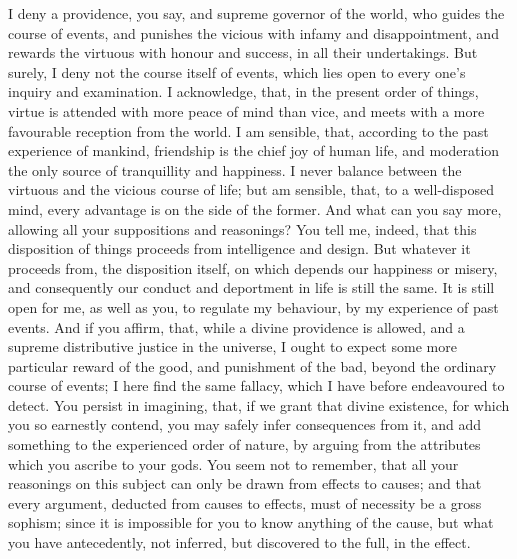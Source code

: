 \documentclass[]{article}
\begin{document}
\begin{sectionbody}
\humeparagraph  I deny a providence, you say, and supreme governor of the world, who guides the course of events, and punishes the vicious with infamy and disappointment, and rewards the virtuous with honour and success, in all their undertakings. But surely, I deny not the course itself of events, which lies open to every one's inquiry and examination. I acknowledge, that, in the present order of things, virtue is attended with more peace of mind than vice, and meets with a more favourable reception from the world. I am sensible, that, according to the past experience of mankind, friendship is the chief joy of human life, and moderation the only source of tranquillity and happiness. I never balance between the virtuous and the vicious course of life; but am sensible, that, to a well-disposed mind, every advantage is on the side of the former. And what can you say more, allowing all your suppositions and reasonings? You tell me, indeed, that this disposition of things proceeds from intelligence and design. But whatever it proceeds from, the disposition itself, on which depends our happiness or misery, and consequently our conduct and deportment in life is still the same. It is still open for me, as well as you, to regulate my behaviour, by my experience of past events. And if you affirm, that, while a divine providence is allowed, and a supreme distributive justice in the universe, I ought to expect some more particular reward of the good, and punishment of the bad, beyond the ordinary course of events; I here find the same fallacy, which I have before endeavoured to detect. You persist in imagining, that, if we grant that divine existence, for which you so earnestly contend, you may safely infer consequences from it, and add something to the experienced order of nature, by arguing from the attributes which you ascribe to your gods. You seem not to remember, that all your reasonings on this subject can only be drawn from effects to causes; and that every argument, deducted from causes to effects, must of necessity be a gross sophism; since it is impossible for you to know anything of the cause, but what you have antecedently, not inferred, but discovered to the full, in the effect.


\end{sectionbody}
\end{document}
